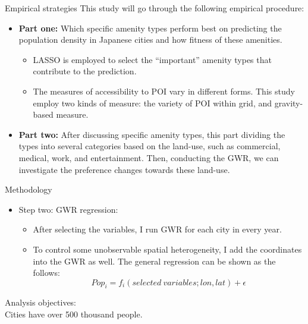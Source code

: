 \documentclass[aspectratio=169,xcolor=dvipsnames]{beamer}
\begin{document}
\begin{frame}{Empirical strategies}
	This study will go through the following empirical procedure:
	\begin{itemize}
	\item \textbf{Part one:} Which specific amenity types perform best on predicting the population density in Japanese cities and how fitness of these amenities.
\begin{itemize}
	\item LASSO is employed to select the ``important'' amenity types that contribute to the prediction.
	\item The measures of accessibility to POI vary in different forms. This study employ two kinds of measure: the variety of POI within grid, and gravity-based measure.
\end{itemize}
\item \textbf{Part two:} After discussing specific amenity types, this part dividing the types into several categories based on the land-use, such as commercial, medical, work, and entertainment. Then, conducting the GWR, we can investigate the preference changes towards these land-use.
	\end{itemize}
\end{frame}
\begin{frame}{Methodology}
	\begin{itemize}
	\item Step two: GWR regression:
\begin{itemize}
	\item After selecting the variables, I run GWR for each city in every year.
	\item To control some unobservable spatial heterogeneity, I add the coordinates into the GWR as well. The general regression can be shown as the follows:
	\begin{equation}
	Pop_{i}=f_i(selected\ variables; lon, lat)+\epsilon
	\end{equation}
\end{itemize}
	\end{itemize}
{\large Analysis objectives: }\\
	Cities have over 500 thousand people.
\end{frame}
\end{document}
